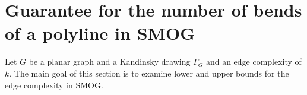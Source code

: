 \section{Guarantee for the number of bends of a polyline in SMOG}
Let $G$ be a planar graph and a Kandinsky drawing $\Gamma_G$ and an edge complexity of $k$. The main goal of this section is to examine lower and upper bounds for the edge complexity in SMOG.

